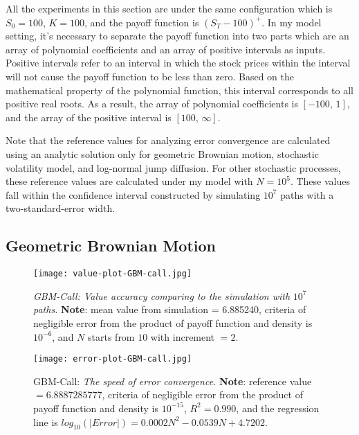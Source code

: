 All the experiments in this section are under the same configuration which is $S_0=100$, $K=100$, and the payoff function is $(S_T - 100)^+$. In my model setting, it's necessary to separate the payoff function into two parts which are an array of polynomial coefficients and an array of positive intervals as inputs. Positive intervals refer to an interval in which the stock prices within the interval will not cause the payoff function to be less than zero. Based on the mathematical property of the polynomial function, this interval corresponds to all positive real roots. As a result, the array of polynomial coefficients is $\left[ -100, \,1\right]$, and the array of the positive interval is $\left[100, \, \infty\right]$.

Note that the reference values for analyzing error convergence are calculated using an analytic solution only for geometric Brownian motion, stochastic volatility model, and log-normal jump diffusion. For other stochastic processes, these reference values are calculated under my model with $N=10^5$. These values fall within the confidence interval constructed by simulating $10^7$ paths with a two-standard-error width.
\newpage

\subsection{Geometric Brownian Motion}
\begin{figure}[H]
    \centering
    \texttt{[image: value-plot-GBM-call.jpg]}
    \caption[\emph{GBM-Call: Value accuracy comparing to the simulation with} $10^7$ \emph{paths.} ] {\emph{GBM-Call: Value accuracy comparing to the simulation with} $10^7$ \emph{paths.} \textbf{Note}: mean value from simulation = 6.885240, criteria of negligible error from the product of payoff function and density is $10^{-6}$, and $N$ starts from $10$ with increment $=2$.}

    \label{fig:label}
\end{figure}

\begin{figure}[H]
    \centering
\texttt{[image: error-plot-GBM-call.jpg]}
    \caption[GBM-Call: \emph{The speed of error convergence.} ]{GBM-Call: \emph{The speed of error convergence.} \textbf{Note}: reference value $=6.8887285777$, criteria of negligible error from the product of payoff function and density is $10^{-15}$, $R^2=0.990$, and the regression line is $log_{10}\left(|Error|\right) = 0.0002N^2-0.0539N+4.7202$.}
    
    \label{fig:label}
\end{figure}

